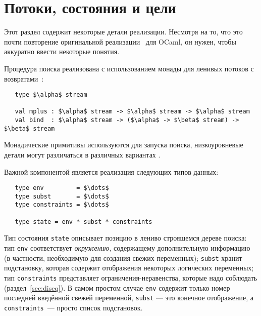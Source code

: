
\section{Потоки, состояния и цели}
\label{sec:goals}

Этот раздел содержит некоторые детали  реализации.
Несмотря на то, что это почти повторение оригинальной реализации~\cite{MicroKanren, CKanren} для OCaml, он нужен, чтобы аккуратно ввести некоторые понятия.

Процедура поиска реализована с использованием монады для ленивых потоков с возвратами~\cite{KiselyovBacktracking}:

\begin{lstlisting}
   type $\alpha$ stream

   val mplus : $\alpha$ stream -> $\alpha$ stream -> $\alpha$ stream
   val bind  : $\alpha$ stream -> ($\alpha$ -> $\beta$ stream) -> $\beta$ stream
\end{lstlisting}

\noindent Монадические примитивы используются для запуска поиска, низкоуровневые детали могут различаться в  различных вариантах \miniKanren.

Важной компонентой является реализация следующих типов данных:

\begin{lstlisting}
   type env         = $\dots$
   type subst       = $\dots$
   type constraints = $\dots$

   type state = env * subst * constraints
\end{lstlisting}
Тип состояния \lstinline|state| описывает позицию в лениво строящемся дереве поиска:
тип \lstinline|env| соответствует  \emph{окружению}, содержащему дополнительную информацию (в частности, необходимую для создания свежих переменных);
\lstinline|subst| хранит подстановку, которая содержит отображения некоторых логических переменных;
тип \lstinline|constraints| представляет ограничения-неравенства, которые надо соблюдать (раздел~\ref{sec:diseq}).
В самом простом случае \lstinline|env| содержит только номер последней введённой свежей переменной, \lstinline|subst| --- это конечное отображение, а \lstinline|constraints|~--- просто список подстановок.

